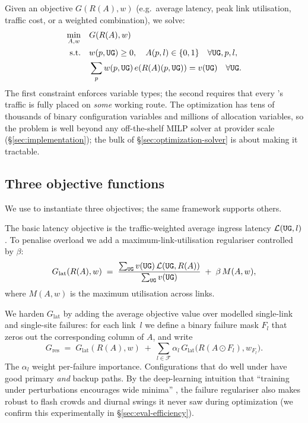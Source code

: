 \documentclass[acmsmall,anonymous,review,nonacm,10pt]{acmart}
\begin{document}
  Given an objective $G(R(A),w)$ (e.g.\
average latency, peak link utilisation, traffic cost, or a
weighted combination), we solve:
\begin{equation}
\label{eq:general_problem}
\begin{aligned}
\min_{A,w}\quad & G(R(A),w) \\
\textrm{s.t.}\quad
& w(p,\texttt{UG})\geq 0,\quad A(p,l)\in\{0,1\}\quad \forall \texttt{UG},p,l, \\
& \sum_{p} w(p,\texttt{UG})\, e(R(A)(p,\texttt{UG})) = v(\texttt{UG})\quad \forall \texttt{UG}.
\end{aligned}
\end{equation}
The first constraint enforces variable types; the second requires
that every \ug's traffic is fully placed on \emph{some} working
route.  The optimization has tens of thousands of binary
configuration variables and millions of allocation variables, so
the problem is well beyond any off-the-shelf MILP solver at
provider scale (\S\ref{sec:implementation}); the bulk of
\S\ref{sec:optimization-solver} is about making it tractable.

\subsection{Three objective functions}
\label{sec:optimization-objectives}

We use  to instantiate three objectives;
the same framework supports others.

  The basic latency
objective is the traffic-weighted average ingress latency
$\mathcal{L}(\texttt{UG},l)$.  To penalise overload we add a
maximum-link-utilisation regulariser controlled by $\beta$:
\begin{equation}
\label{eq:mlu_constraint}
G_{\mathrm{lat}}(R(A),w) \;=\;
\frac{\sum_{\texttt{UG}} v(\texttt{UG})\,\mathcal{L}(\texttt{UG}, R(A))}
     {\sum_{\texttt{UG}} v(\texttt{UG})}
\;+\; \beta\,M(A,w),
\end{equation}
where $M(A,w)$ is the maximum utilisation across links.

  We harden $G_{\mathrm{lat}}$
by adding the average objective value over modelled single-link
and single-site failures: for each link~$l$ we define a binary
failure mask $F_l$ that zeros out the corresponding column of $A$,
and write
\begin{equation}
\label{eq:failure_reg}
G_{\mathrm{res}} \;=\; G_{\mathrm{lat}}(R(A),w)
     \;+\; \sum_{l\in\mathcal F}\alpha_l\,
       G_{\mathrm{lat}}\!\bigl(R(A\!\odot\! F_l), w_{F_l}\bigr).
\end{equation}
The $\alpha_l$ weight per-failure importance.  Configurations that
do well under \Cref{eq:failure_reg} have good primary \emph{and}
backup paths.  By the deep-learning intuition that ``training
under perturbations encourages wide minima''
\cite{huang2020understanding}, the failure regulariser also makes
\sparse robust to flash crowds and diurnal swings it never saw
during optimization (we confirm this experimentally in
\S\ref{sec:eval-efficiency}).
\end{document}
